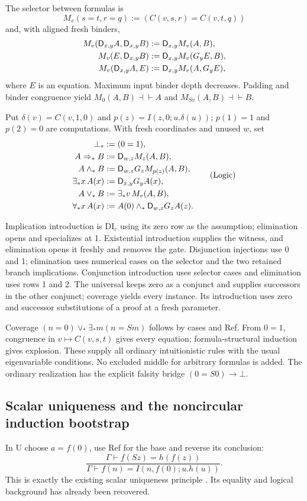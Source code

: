 \documentclass[11pt]{article}
\begin{document}
The selector between formulas is
\[
 M_v(s=t,r=q):=(C(v,s,r)=C(v,t,q))
\]
and, with aligned fresh binders,
\[
\begin{aligned}
 M_v(\mathsf D_{x,y}A,\mathsf D_{x,y}B)&:=\mathsf D_{x,y}M_v(A,B),\\
 M_v(E,\mathsf D_{x,y}B)&:=\mathsf D_{x,y}M_v(G_yE,B),\\
 M_v(\mathsf D_{x,y}A,E)&:=\mathsf D_{x,y}M_v(A,G_yE),
\end{aligned}
\]
where $E$ is an equation. Maximum input binder depth decreases.
Padding and binder congruence yield
$M_0(A,B)\dashv\vdash A$ and $M_{Sv}(A,B)\dashv\vdash B$.

Put $\delta(v)=C(v,1,0)$ and $p(z)=I(z,0;u.\delta(u))$;
$p(1)=1$ and $p(2)=0$ are computations. With fresh coordinates and unused
$w$, set
\[
\begin{aligned}
 \bot_*&:=(0=1),\\
 A\Rightarrow_*B&:=\mathsf D_{w,z}M_z(A,B),\\
 A\wedge_*B&:=\mathsf D_{w,z}G_zM_{p(z)}(A,B),\\
 \exists_*x\,A(x)&:=\mathsf D_{x,y}G_yA(x),\\
 A\vee_*B&:=\exists_*v\,M_v(A,B),\\
 \forall_*x\,A(x)&:=A(0)\wedge_*\mathsf D_{w,z}G_zA(z).
\end{aligned}                                                   \tag{Logic}
\]

Implication introduction is DI$_c$ using its zero row as the assumption;
elimination opens and specializes at 1. Existential introduction supplies
the witness, and elimination opens it freshly and removes the gate.
Disjunction injections use 0 and 1; elimination uses numerical cases on
the selector and the two retained branch implications.
Conjunction introduction uses selector cases and elimination uses rows
1 and 2. The universal keeps zero as a conjunct and supplies successors
in the other conjunct; coverage yields every instance.
Its introduction uses zero and successor substitutions of a proof at a
fresh parameter.

Coverage $(n=0)\vee_*\exists_*m(n=Sm)$ follows by cases and Ref.
From $0=1$, congruence in $v\mapsto C(v,s,t)$ gives every equation;
formula-structural induction gives explosion. These supply all ordinary
intuitionistic rules with the usual eigenvariable conditions.
No excluded middle for arbitrary formulas is added. The ordinary
realization has the explicit falsity bridge $(0=S0)\to\bot$.

\subsection{Scalar uniqueness and the noncircular induction bootstrap}
In U choose $a=f(0)$, use Ref for the base and reverse its conclusion:
\[
 \frac{\Gamma\vdash f(Sz)=h(f(z))}
      {\Gamma\vdash f(n)=I(n,f(0);u.h(u))}.                \tag{UR}\label{eq:ur}
\]
This is exactly the existing scalar uniqueness principle \cite{ur}.
Its equality and logical background has already been recovered.
\end{document}

